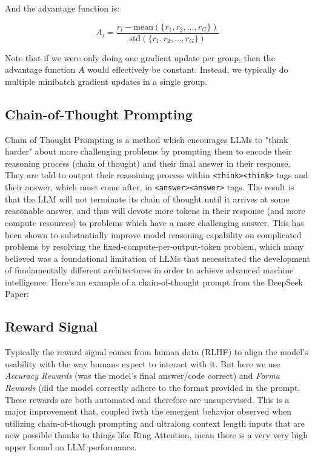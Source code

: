 \documentclass[12pt]{article}
\begin{document}
And the advantage function is:

\[
A_i = \frac{r_i - \text{mean}(\{r_1, r_2, \dots, r_G\})}{\text{std}(\{r_1, r_2, \dots, r_G\})}
\]

Note that if we were only doing one gradient update per group, then the advantage function \(A\) would effectively be constant. Instead, we typically do multiple minibatch gradient updates in a single group.


\subsection{Chain-of-Thought Prompting}
Chain of Thought Prompting is a method which encourages LLMs to "think harder" about more challenging problems by prompting them to encode their reasoning process (chain of thought) and their final answer in their response. They are told to output their reasoining process within \texttt{<think><think>} tags and their answer, which must come after, in \texttt{<answer><answer>} tags. The result is that the LLM will not terminate its chain of thought until it arrives at some reasonable answer, and thus will devote more tokens in their response (and more compute resources) to problems which have a more challenging answer. This has been shown to substantially improve model reasoning capability on complicated problems by resolving the fixed-compute-per-output-token problem, which many believed was a foundational limitation of LLMs that necessitated the development of fundamentally different architectures in order to achieve advanced machine intelligence. Here's an example of a chain-of-thought prompt from the DeepSeek Paper:

\subsection{Reward Signal}
Typically the reward signal comes from human data (RLHF) to align the model's usability with the way humans expect to interact with it. But here we use \emph{Accuracy Rewards} (was the model's final answer/code correct) and \emph{Forma Rewards} (did the model correctly adhere to the format provided in the prompt. These rewards are both automated and therefore are unsupervised. This is a major improvement that, coupled iwth the emergent behavior observed when utilizing chain-of-though prompting and ultralong context length inputs that are now possible thanks to things like Ring Attention, mean there is a very very high upper bound on LLM performance. 
\end{document}

